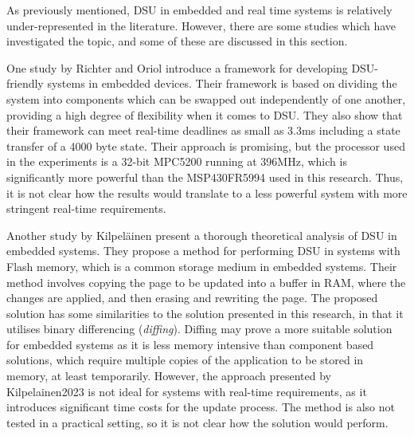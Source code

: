 As previously mentioned, DSU in embedded and real time systems is relatively under-represented in the literature. However, there are some studies which have investigated the topic, and some of these are discussed in this section.

One study by Richter and Oriol \cite{richter2009} introduce a framework for developing DSU-friendly systems in embedded devices. Their framework is based on dividing the system into components which can be swapped out independently of one another, providing a high degree of flexibility when it comes to DSU. They also show that their framework can meet real-time deadlines as small as 3.3ms including a state transfer of a  4000 byte state.  Their approach is promising, but the processor used in the experiments is a 32-bit MPC5200 running at 396MHz, which is significantly more powerful than the MSP430FR5994 used in this research. Thus, it is not clear how the results would translate to a less powerful system with more stringent real-time requirements.

Another study by Kilpeläinen \cite{Kilpelainen2023} present a thorough theoretical analysis of DSU in embedded systems. They propose a method for performing DSU in systems with Flash memory, which is a common storage medium in embedded systems. Their method involves copying the page to be updated into a buffer in RAM, where the changes are applied, and then erasing and rewriting the page. The proposed solution has some similarities to the solution presented in this research, in that it utilises binary differencing (\textit{diffing}). Diffing may prove a more suitable solution for embedded systems as it is less memory intensive than component based solutions, which require multiple copies of the application to be stored in memory, at least temporarily. However, the approach presented by Kilpelainen2023 is not ideal for systems with real-time requirements, as it introduces significant time costs for the update process. The method is also not tested in a practical setting, so it is not clear how the solution would perform. 

